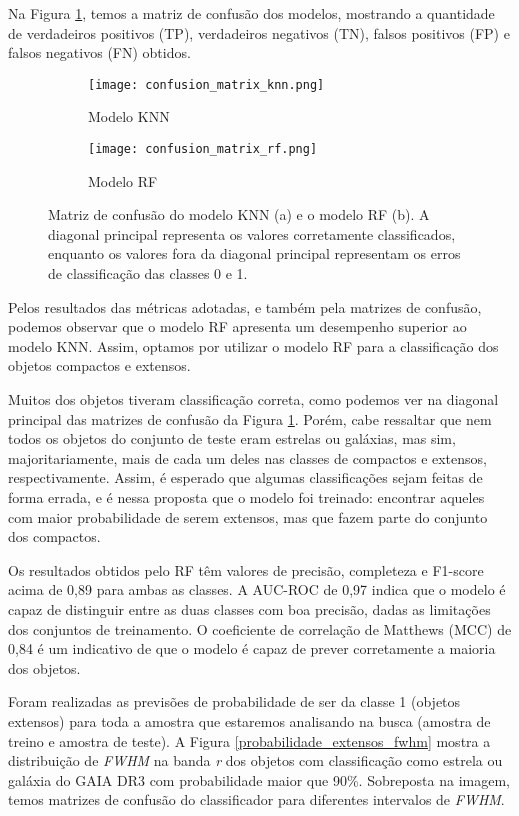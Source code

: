 Na Figura \ref{confusion_matrix}, temos a matriz de confusão dos modelos, mostrando a quantidade de verdadeiros positivos (TP), verdadeiros negativos (TN), falsos positivos (FP) e falsos negativos (FN) obtidos.

\begin{figure}[!ht]
    \centering
    \captionsetup{justification=centering}
    \begin{subfigure}[b]{0.48\textwidth}
        \texttt{[image: confusion\_matrix\_knn.png]}
        \caption{Modelo KNN}
    \end{subfigure}
    \begin{subfigure}[b]{0.48\textwidth}
        \texttt{[image: confusion\_matrix\_rf.png]}
        \caption{Modelo RF}
    \end{subfigure}
    \caption{Matriz de confusão do modelo KNN (a) e o modelo RF (b). A diagonal principal representa os valores corretamente classificados, enquanto os valores fora da diagonal principal representam os erros de classificação das classes 0 e 1.}
    \label{confusion_matrix}
\end{figure}

Pelos resultados das métricas adotadas, e também pela matrizes de confusão, podemos observar que o modelo RF apresenta um desempenho superior ao modelo KNN. Assim, optamos por utilizar o modelo RF para a classificação dos objetos compactos e extensos.

Muitos dos objetos tiveram classificação correta, como podemos ver na diagonal principal das matrizes de confusão da Figura \ref{confusion_matrix}. Porém, cabe ressaltar que nem todos os objetos do conjunto de teste eram estrelas ou galáxias, mas sim, majoritariamente, mais de cada um deles nas classes de compactos e extensos, respectivamente. Assim, é esperado que algumas classificações sejam feitas de forma errada, e é nessa proposta que o modelo foi treinado: encontrar aqueles com maior probabilidade de serem extensos, mas que fazem parte do conjunto dos compactos.

Os resultados obtidos pelo RF têm valores de precisão, completeza e F1-score acima de 0,89 para ambas as classes. A AUC-ROC de 0,97 indica que o modelo é capaz de distinguir entre as duas classes com boa precisão, dadas as limitações dos conjuntos de treinamento. O coeficiente de correlação de Matthews (MCC) de 0,84 é um indicativo de que o modelo é capaz de prever corretamente a maioria dos objetos.

Foram realizadas as previsões de probabilidade de ser da classe 1 (objetos extensos) para toda a amostra que estaremos analisando na busca (amostra de treino e amostra de teste). A Figura \ref{probabilidade_extensos_fwhm} mostra a distribuição de \textit{FWHM} na banda \textit{r} dos objetos com classificação como estrela ou galáxia do GAIA DR3 com probabilidade maior que 90\%. Sobreposta na imagem, temos matrizes de confusão do classificador para diferentes intervalos de \textit{FWHM}.

